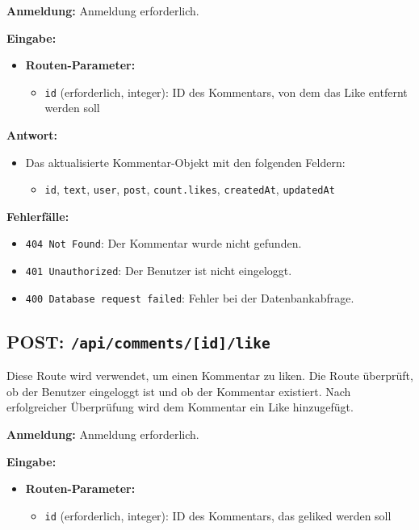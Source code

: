 \documentclass[a4paper,12pt]{article}
\begin{document}
\textbf{Anmeldung:} Anmeldung erforderlich.

\textbf{Eingabe:}
\begin{itemize}
    \item \textbf{Routen-Parameter:}
    \begin{itemize}
        \item \texttt{id} (erforderlich, integer):
            ID des Kommentars, von dem das Like entfernt werden soll
    \end{itemize}
\end{itemize}

\textbf{Antwort:}
\begin{itemize}
    \item Das aktualisierte Kommentar-Objekt mit den folgenden Feldern:
    \begin{itemize}
        \item \texttt{id},
              \texttt{text},
              \texttt{user},
              \texttt{post},
              \texttt{count.likes},
              \texttt{createdAt},
              \texttt{updatedAt}
    \end{itemize}
\end{itemize}

\textbf{Fehlerfälle:}
\begin{itemize}
    \item \texttt{404 Not Found}:
        Der Kommentar wurde nicht gefunden.
    \item \texttt{401 Unauthorized}:
        Der Benutzer ist nicht eingeloggt.
    \item \texttt{400 Database request failed}:
        Fehler bei der Datenbankabfrage.
\end{itemize}

\newpage
\subsection{POST: \texttt{/api/comments/[id]/like}}

Diese Route wird verwendet, um einen Kommentar zu liken. Die Route überprüft,
ob der Benutzer eingeloggt ist und ob der Kommentar existiert. Nach
erfolgreicher Überprüfung wird dem Kommentar ein Like hinzugefügt.

\textbf{Anmeldung:} Anmeldung erforderlich.

\textbf{Eingabe:}
\begin{itemize}
    \item \textbf{Routen-Parameter:}
    \begin{itemize}
        \item \texttt{id} (erforderlich, integer):
            ID des Kommentars, das geliked werden soll
    \end{itemize}
\end{itemize}
\end{document}
